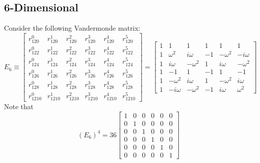 \subsection{6-Dimensional}
Consider the following Vandermonde matrix:
\begin{equation}
    E_{6} \equiv \begin{bmatrix}
        r_{120}^{0} & r_{120}^{1} & r_{120}^{2} & r_{120}^{3} & r_{120}^{4} & r_{120}^{5} \\
        r_{122}^{0} & r_{122}^{1} & r_{122}^{2} & r_{122}^{3} & r_{122}^{4} & r_{122}^{5} \\
        r_{124}^{0} & r_{124}^{1} & r_{124}^{2} & r_{124}^{3} & r_{124}^{4} & r_{124}^{5} \\
        r_{126}^{0} & r_{126}^{1} & r_{126}^{2} & r_{126}^{3} & r_{126}^{4} & r_{126}^{5} \\
        r_{128}^{0} & r_{128}^{1} & r_{128}^{2} & r_{128}^{3} & r_{128}^{4} & r_{128}^{5} \\
        r_{1210}^{0} & r_{1210}^{1} & r_{1210}^{2} & r_{1210}^{3} & r_{1210}^{4} & r_{1210}^{5}
    \end{bmatrix} = \begin{bmatrix}
        1 & 1 & 1 & 1 & 1 & 1 \\
        1 & \omega^{2} & i\omega & -1 & -\omega^{2} & -i\omega \\
        1 & i\omega & -\omega^{2} & 1 & i\omega & -\omega^{2} \\
        1 & -1 & 1 & -1 & 1 & -1 \\
        1 & -\omega^{2} & i\omega & 1 & -\omega^{2} & i\omega \\
        1 & -i\omega & -\omega^{2} & -1 & i\omega & \omega^{2}
    \end{bmatrix}
\end{equation}
Note that
\begin{equation}
    \left( E_{6} \right)^{4} = 36 \begin{bmatrix}
        1 & 0 & 0 & 0 & 0 & 0 \\
        0 & 1 & 0 & 0 & 0 & 0 \\
        0 & 0 & 1 & 0 & 0 & 0 \\
        0 & 0 & 0 & 1 & 0 & 0 \\
        0 & 0 & 0 & 0 & 1 & 0 \\
        0 & 0 & 0 & 0 & 0 & 1
    \end{bmatrix}
\end{equation}
